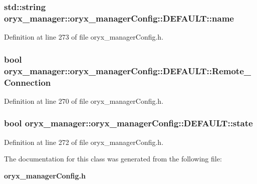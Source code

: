 \subsubsection[{name}]{\setlength{\rightskip}{0pt plus 5cm}std\-::string {\bf oryx\-\_\-manager\-::oryx\-\_\-manager\-Config\-::\-D\-E\-F\-A\-U\-L\-T\-::name}}\label{classoryx__manager_1_1oryx__managerConfig_1_1DEFAULT_a19b0bd9ca4ac67e7962b1a52508a94c2}


\-Definition at line 273 of file oryx\-\_\-manager\-Config.\-h.

\subsubsection[{\-Remote\-\_\-\-Connection}]{\setlength{\rightskip}{0pt plus 5cm}bool {\bf oryx\-\_\-manager\-::oryx\-\_\-manager\-Config\-::\-D\-E\-F\-A\-U\-L\-T\-::\-Remote\-\_\-\-Connection}}\label{classoryx__manager_1_1oryx__managerConfig_1_1DEFAULT_a471f8261baf90d44c65c3e5da4f09e1c}


\-Definition at line 270 of file oryx\-\_\-manager\-Config.\-h.

\subsubsection[{state}]{\setlength{\rightskip}{0pt plus 5cm}bool {\bf oryx\-\_\-manager\-::oryx\-\_\-manager\-Config\-::\-D\-E\-F\-A\-U\-L\-T\-::state}}\label{classoryx__manager_1_1oryx__managerConfig_1_1DEFAULT_a5b49c494d9e1635206ebf630b0f8e674}


\-Definition at line 272 of file oryx\-\_\-manager\-Config.\-h.



\-The documentation for this class was generated from the following file\-:\begin{DoxyCompactItemize}
\item 
{\bf oryx\-\_\-manager\-Config.\-h}\end{DoxyCompactItemize}
